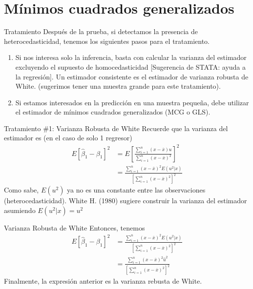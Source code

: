 \section[MCG]{Mínimos cuadrados generalizados}

\begin{frame}{Tratamiento}
	Después de la prueba, si detectamos la presencia de heterocedasticidad, tenemos los siguientes pasos para el tratamiento.
		\begin{enumerate}
			\item Si nos interesa solo la inferencia, basta con calcular la varianza del estimador excluyendo el supuesto de homocedasticidad \textsf{[Sugerencia de STATA: ayuda a la regresión]}. Un estimador consistente es el estimador de varianza robusta de White. (sugerimos tener una muestra grande para este tratamiento).
			\item Si estamos interesados en la predicción en una muestra pequeña, debe utilizar el estimador de mínimos cuadrados generalizados (MCG o GLS).
		\end{enumerate}
\end{frame}
\begin{frame}{Tratamiento \#1: Varianza Robusta de White}
	Recuerde que la varianza del estimador es (en el caso de solo 1 regresor)
		\begin{align*}
			E[\widehat{\beta}_1 - \beta_1]^2 & = E\left[ \frac{\sum_{i=1}^{n}(x - \overline{x})u}{\sum_{i=1}^{n}(x - \overline{x})^2} \right]^2\\
			& = \frac{\sum_{i=1}^{n}(x - \overline{x})^2 E(u^2|x)}{\left[\sum_{i=1}^{n}(x - \overline{x})^2\right]^2}
		\end{align*}
	Como sabe, $E(u^2)$ ya no es una constante entre las observaciones (heterocedasticidad). White H. (1980) sugiere construir la varianza del estimador asumiendo $E (u^2|x)=u^2$
\end{frame}
\begin{frame}{Varianza Robusta de White}
	Entonces, tenemos
		\begin{align*}
			E[\widehat{\beta}_1 - \beta_1]^2 &= \frac{\sum_{i=1}^{n}(x - \overline{x})^2 E(u^2|x)}{\left[\sum_{i=1}^{n}(x - \overline{x})^2\right]^2}\\
			& = \frac{\sum_{i=1}^{n}(x - \overline{x})^2 \widehat{u}^2}{\left[\sum_{i=1}^{n}(x - \overline{x})^2\right]^2}
		\end{align*}
	Finalmente, la expresión anterior es la varianza rebusta de White.
\end{frame}
